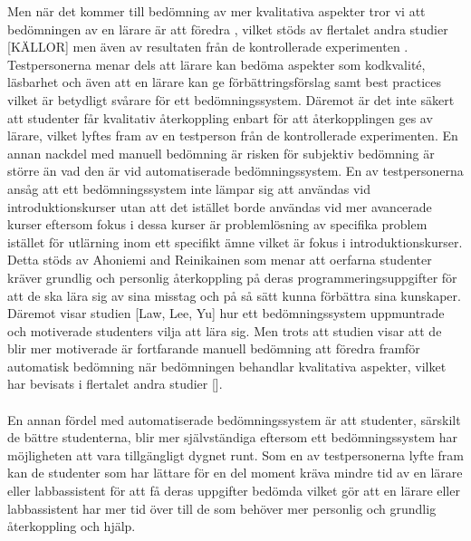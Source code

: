 \documentclass[a4paper,11pt]{article}
\begin{document}
{Men när det kommer till bedömning av mer kvalitativa aspekter tror vi att bedömningen av en lärare är att föredra , vilket stöds av flertalet andra studier [KÄLLOR] men även av resultaten från de kontrollerade experimenten  . Testpersonerna menar dels att lärare kan bedöma aspekter som kodkvalité, läsbarhet och även att en lärare kan ge förbättringsförslag samt best practices vilket är betydligt svårare för ett bedömningssystem. Däremot är det inte säkert att studenter får kvalitativ återkoppling enbart för att återkopplingen ges av lärare, vilket lyftes fram av en testperson från de kontrollerade experimenten. En annan nackdel med manuell bedömning är risken för subjektiv bedömning är större än vad den är vid automatiserade bedömningssystem. En av testpersonerna ansåg att ett bedömningssystem inte lämpar sig att användas vid introduktionskurser utan att det istället borde användas vid mer avancerade kurser eftersom fokus i dessa kurser är problemlösning av specifika problem istället för utlärning inom ett specifikt ämne vilket är fokus i introduktionskurser. Detta stöds av Ahoniemi and Reinikainen som menar att oerfarna studenter kräver grundlig och personlig återkoppling på deras programmeringsuppgifter för att de ska lära sig av sina misstag och på så sätt kunna förbättra sina kunskaper. Däremot visar studien [Law, Lee, Yu] hur ett bedömningssystem uppmuntrade och motiverade studenters vilja att lära sig. Men trots att studien visar att de blir mer motiverade är fortfarande manuell bedömning att föredra framför automatisk bedömning när bedömningen behandlar kvalitativa aspekter, vilket har bevisats i flertalet andra studier []. 
\\
\\
En annan fördel med automatiserade bedömningssystem är att studenter, särskilt de bättre studenterna, blir mer självständiga eftersom ett bedömningssystem har möjligheten att vara tillgängligt dygnet runt. Som en av testpersonerna lyfte fram kan de studenter som har lättare för en del moment kräva mindre tid av en lärare eller labbassistent för att få deras uppgifter bedömda vilket gör att en lärare eller labbassistent har mer tid över till de som behöver mer personlig och grundlig återkoppling och hjälp. 
}
\end{document}
